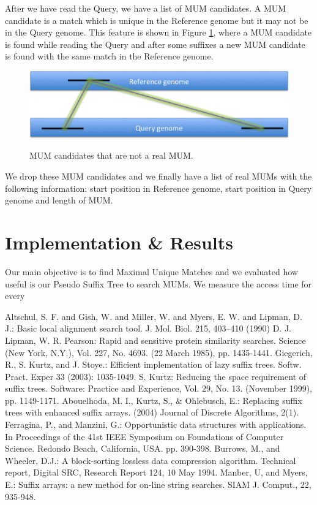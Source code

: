 \documentclass[runningheads,a4paper]{llncs}
\begin{document}
After we have read the Query, we have a list of MUM candidates. A MUM candidate is a match which is unique in the Reference genome but it may not be in the Query genome. This feature is shown in Figure \ref{fig:mumcand}, where a MUM candidate is found while reading the Query and after some suffixes a new MUM candidate is found with the same match in the Reference genome.
\begin{figure}
\centering
\includegraphics[scale=0.5]{Whole-MUM.png}
\label{fig:mumcand}
\caption{MUM candidates that are not a real MUM.}
\end{figure}
We drop these MUM candidates and we finally have a list of real MUMs with the following information: start position in Reference genome, start position in Query genome and length of MUM.
\section{Implementation \& Results}
Our main objective is to find Maximal Unique Matches and we evaluated how useful is our Pseudo Suffix Tree to search MUMs. We measure the access time for every 
\begin{thebibliography}{8}
   Altschul, S. F. and Gish, W. and Miller, W. and Myers, E. W. and Lipman, D. J.: Basic local alignment search tool. J. Mol. Biol. 215, 403--410 (1990)
   D. J. Lipman, W. R. Pearson: Rapid and sensitive protein similarity searches. Science (New York, N.Y.), Vol. 227, No. 4693. (22 March 1985), pp. 1435-1441.
   Giegerich, R., S. Kurtz, and J. Stoye.: Efficient implementation of lazy suffix trees. Softw. Pract. Exper 33 (2003): 1035-1049.
   S. Kurtz: Reducing the space requirement of suffix trees. Software: Practice and Experience, Vol. 29, No. 13. (November 1999), pp. 1149-1171.
   Abouelhoda, M. I., Kurtz, S., \& Ohlebusch, E.: Replacing suffix trees with enhanced suffix arrays. (2004) Journal of Discrete Algorithms, 2(1).
   Ferragina, P., and Manzini, G.: Opportunistic data structures with applications. In Proceedings of the 41st IEEE Symposium on Foundations of Computer Science. Redondo Beach, California, USA. pp. 390-398.
   Burrows, M., and Wheeler, D.J.: A block-sorting lossless data compression algorithm. Technical report, Digital SRC, Research Report 124, 10 May 1994.
   Manber, U, and Myers, E.: Suffix arrays: a new method for on-line string searches. SIAM J. Comput., 22, 935-948.
\end{thebibliography}
\end{document}
